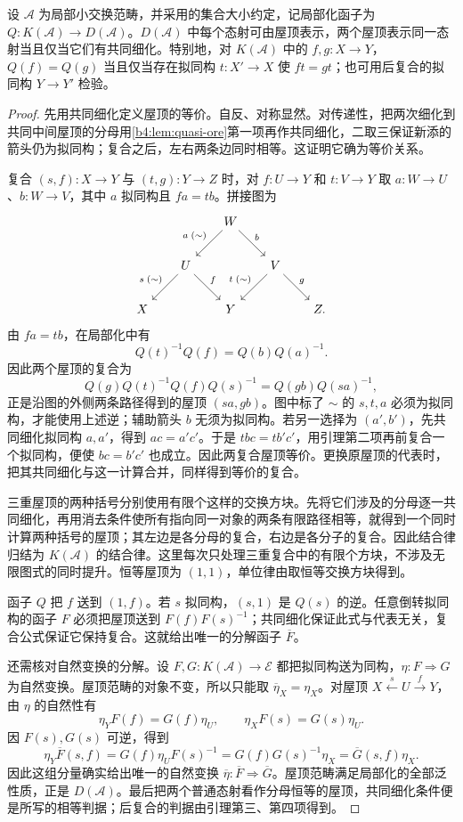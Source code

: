 \begin{theorem}\label{b4:thm:roof-calculus}
	设 \(\mathcal A\) 为局部小交换范畴，并采用的集合大小约定，记局部化函子为 \(Q:K(\mathcal A)\to D(\mathcal A)\)。\(D(\mathcal A)\) 中每个态射可由屋顶表示，两个屋顶表示同一态射当且仅当它们有共同细化。特别地，对 \(K(\mathcal A)\) 中的 \(f,g:X\to Y\)，\(Q(f)=Q(g)\) 当且仅当存在拟同构 \(t:X'\to X\) 使 \(ft=gt\)；也可用后复合的拟同构 \(Y\to Y'\) 检验。
\end{theorem}
\begin{proof}
	先用共同细化定义屋顶的等价。自反、对称显然。对传递性，把两次细化到共同中间屋顶的分母用\cref{b4:lem:quasi-ore}第一项再作共同细化，二取三保证新添的箭头仍为拟同构；复合之后，左右两条边同时相等。这证明它确为等价关系。

	复合 \((s,f):X\to Y\) 与 \((t,g):Y\to Z\) 时，对 \(f:U\to Y\) 和 \(t:V\to Y\) 取 \(a:W\to U\)、\(b:W\to V\)，其中 \(a\) 拟同构且 \(fa=tb\)。拼接图为
	\[
		\begin{tikzcd}[column sep=1.8em,row sep=2.1em]
			&&W\arrow[dl,"a\;(\sim)"']\arrow[dr,"b"]&&\\
			&U\arrow[dl,"s\;(\sim)"']\arrow[dr,"f"]&&V\arrow[dl,"t\;(\sim)"']\arrow[dr,"g"]&\\
			X&&Y&&Z.
		\end{tikzcd}
	\]
	由 \(fa=tb\)，在局部化中有
	\[
		Q(t)^{-1}Q(f)=Q(b)Q(a)^{-1}.
	\]
	因此两个屋顶的复合为
	\[
		Q(g)Q(t)^{-1}Q(f)Q(s)^{-1} =Q(gb)Q(sa)^{-1},
	\]
	正是沿图的外侧两条路径得到的屋顶 \((sa,gb)\)。图中标了 \(\sim\) 的 \(s,t,a\) 必须为拟同构，才能使用上述逆；辅助箭头 \(b\) 无须为拟同构。若另一选择为 \((a',b')\)，先共同细化拟同构 \(a,a'\)，得到 \(ac=a'c'\)。于是 \(tbc=tb'c'\)，用引理第二项再前复合一个拟同构，便使 \(bc=b'c'\) 也成立。因此两复合屋顶等价。更换原屋顶的代表时，把其共同细化与这一计算合并，同样得到等价的复合。

	三重屋顶的两种括号分别使用有限个这样的交换方块。先将它们涉及的分母逐一共同细化，再用消去条件使所有指向同一对象的两条有限路径相等，就得到一个同时计算两种括号的屋顶；其左边是各分母的复合，右边是各分子的复合。因此结合律归结为 \(K(\mathcal A)\) 的结合律。这里每次只处理三重复合中的有限个方块，不涉及无限图式的同时提升。恒等屋顶为 \((1,1)\)，单位律由取恒等交换方块得到。

	函子 \(Q\) 把 \(f\) 送到 \((1,f)\)。若 \(s\) 拟同构，\((s,1)\) 是 \(Q(s)\) 的逆。任意倒转拟同构的函子 \(F\) 必须把屋顶送到 \(F(f)F(s)^{-1}\)；共同细化保证此式与代表无关，复合公式保证它保持复合。这就给出唯一的分解函子 \(\overline F\)。

	还需核对自然变换的分解。设 \(F,G:K(\mathcal A)\to\mathcal E\) 都把拟同构送为同构，\(\eta:F\Rightarrow G\) 为自然变换。屋顶范畴的对象不变，所以只能取 \(\overline\eta_X=\eta_X\)。对屋顶 \(X\xleftarrow{s}U\xrightarrow{f}Y\)，由 \(\eta\) 的自然性有
	\[
		\eta_YF(f)=G(f)\eta_U,\qquad \eta_XF(s)=G(s)\eta_U.
	\]
	因 \(F(s),G(s)\) 可逆，得到
	\[
		\eta_Y\overline F(s,f) =G(f)\eta_UF(s)^{-1} =G(f)G(s)^{-1}\eta_X =\overline G(s,f)\eta_X.
	\]
	因此这组分量确实给出唯一的自然变换 \(\overline\eta:\overline F\Rightarrow\overline G\)。屋顶范畴满足局部化的全部泛性质，正是 \(D(\mathcal A)\)。最后把两个普通态射看作分母恒等的屋顶，共同细化条件便是所写的相等判据；后复合的判据由引理第三、第四项得到。
\end{proof}

